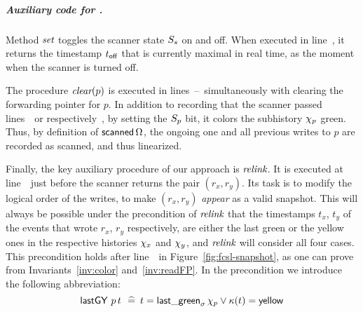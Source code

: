 \subparagraph*{Auxiliary code for \jyscan.} 
%
Method $\textit{set}$ toggles the scanner state $S_s$ on and off. When
executed in line~\lineScanUnsetsS, it returns the timestamp $t_{\mathsf{off}}$
that is currently maximal in real time, as the moment when the scanner
is turned off.
%

The procedure $\textit{clear}(p)$ is executed in
lines~\lineScanClearsX--\lineScanClearsY~simultaneously with clearing
the forwarding pointer for $p$. In addition to recording that the
scanner passed lines~\lineScanClearsX\ or
respectively~\lineScanClearsY, by setting the $S_p$ bit, it colors
the subhistory $\chi_p$ green. Thus, by definition of
$\mathsf{scanned}\,\Omega$, the ongoing one and all previous writes to
$p$ are recorded as scanned, and thus linearized.

Finally, the key auxiliary procedure of our approach is
$\textit{relink}$. It is executed at line~\lineScanRelinks~just before
the scanner returns the pair $(r_x, r_y)$. Its task is to modify the
logical order of the writes, to make $(r_x, r_y)$ \emph{appear} as a
valid snapshot. This will always be possible under the precondition of
$\textit{relink}$ that the timestamps $t_x$, $t_y$ of the events that
wrote $r_x$, $r_y$ respectively, are either the last green or the
yellow ones in the respective histories $\chi_x$ and $\chi_y$, and
$\textit{relink}$ will consider all four cases.  This precondition holds
after line~\lineScanChoosesRY~in Figure~\ref{fig:fcsl-snapshot}, as
one can prove from Invariants~\ref{inv:color} and~\ref{inv:readFP}. In
the precondition we introduce the following abbreviation:
%
\begin{equation}\label{eq:lgVy}
\hfill \lgVy\ p\, t\, \eqdef t = \mathsf{last\_green}_{\ordlist}\,
       \histp \vee \C(t) = \mathsf{yellow}\hfill
\end{equation}
%


